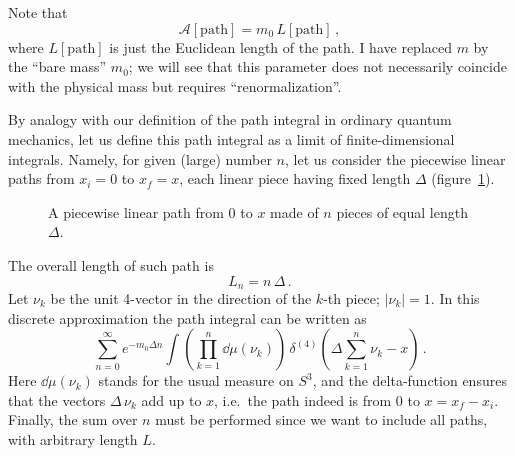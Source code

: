 Note that
\[
\mathcal A[\text{path}]=m_0\,L[\text{path}]\,,
\]
where $L[\text{path}]$ is just the Euclidean length of the path. I have
replaced $m$ by the ``bare mass'' $m_0$; we will see that this parameter does
not necessarily coincide with the physical mass but requires
``renormalization''.

By analogy with our definition of the path integral in ordinary quantum
mechanics, let us define this path integral as a limit of finite-dimensional
integrals. Namely, for given (large) number $n$, let us consider the piecewise
linear paths from $x_i=0$ to $x_f=x$, each linear piece having fixed length
$\Delta$ (figure~\ref{fig:steps}).
\begin{figure}[ht]
\centering{}
\caption{A piecewise linear path from $0$ to $x$ made of $n$ pieces of equal
length $\Delta$.}
\label{fig:steps}
\end{figure}
The overall length of such path is
\[
L_n=n\,\Delta\,.
\]
Let $\nu_k$ be the unit 4-vector in the direction of the $k$-th piece;
$|\nu_k|=1$. In this discrete approximation the path integral can be written
as
\[
\sum_{n=0}^\infty e^{-m_0\Delta n}\int\left(\prod_{k=1}^n\dd\mu(\nu_k)\right)\,\delta^{(4)}\left(\Delta\sum_{k=1}^n\nu_k-x\right)\,.
\]
Here $\dd\mu(\nu_k)$ stands for the usual measure on $S^3$, and the
delta-function ensures that the vectors $\Delta\,\nu_k$ add up to $x$, i.e.\
the path indeed is from $0$ to $x=x_f-x_i$. Finally, the sum over $n$ must be
performed since we want to include all paths, with arbitrary length $L$.

